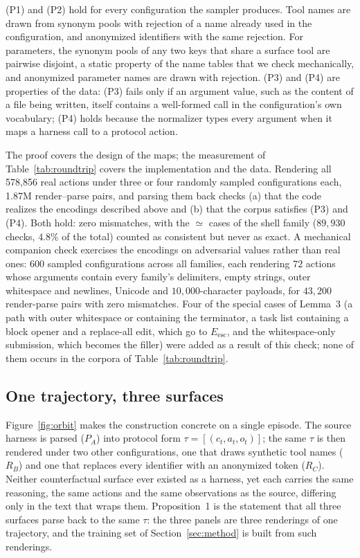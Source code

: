 \documentclass{article} %
\newcommand{\numactions}{578{,}856}       %
\newcommand{\numroundtrip}{1.87M}         %
\begin{document}
(P1) and (P2) hold for every configuration the sampler produces. Tool names
are drawn from synonym pools with rejection of a name already used in the
configuration, and anonymized identifiers with the same rejection. For
parameters, the synonym pools of any two keys that share a surface tool are
pairwise disjoint, a static property of the name tables that we check
mechanically, and anonymized parameter names are drawn with rejection. (P3)
and (P4) are properties of the data: (P3) fails only if an argument value,
such as the content of a file being written, itself contains a well-formed call
in the configuration's own vocabulary; (P4) holds because the normalizer types
every argument when it maps a harness call to a protocol action.

The proof covers the design of the maps; the measurement of
Table~\ref{tab:roundtrip} covers the implementation and the data. Rendering
all \numactions{} real actions under three or four randomly sampled
configurations each, \numroundtrip{} render--parse pairs, and parsing them back
checks (a) that the code realizes the encodings described above and (b) that
the corpus satisfies (P3) and (P4). Both hold: zero mismatches, with the
$\simeq$ cases of the shell family ($89{,}930$ checks, $4.8\%$ of the total)
counted as consistent but never as exact. A mechanical companion check exercises the encodings on adversarial
values rather than real ones: $600$ sampled configurations across all
families, each rendering $72$ actions whose arguments contain every family's
delimiters, empty strings, outer whitespace and newlines, Unicode and
$10{,}000$-character payloads, for $43{,}200$ render-parse pairs with zero
mismatches. Four of the special cases of Lemma~3 (a path with outer whitespace
or containing the terminator, a task list containing a block opener and a
replace-all edit, which go to $E_{\mathrm{esc}}$, and the whitespace-only
submission, which becomes the filler) were added as a result of this check;
none of them occurs in the corpora of Table~\ref{tab:roundtrip}.

\subsection{One trajectory, three surfaces}
\label{app:orbit}

Figure~\ref{fig:orbit} makes the construction concrete on a single episode.
The source harness is parsed ($P_A$) into protocol form
$\tau = [(c_t, a_t, o_t)]$; the same $\tau$ is then rendered under two other
configurations, one that draws synthetic tool names ($R_B$) and one that
replaces every identifier with an anonymized token ($R_C$). Neither
counterfactual surface ever existed as a harness, yet each carries the same
reasoning, the same actions and the same observations as the source, differing
only in the text that wraps them. Proposition~1 is the statement that all
three surfaces parse back to the same $\tau$: the three panels are three
renderings of one trajectory, and the training set of
Section~\ref{sec:method} is built from such renderings.
\end{document}
